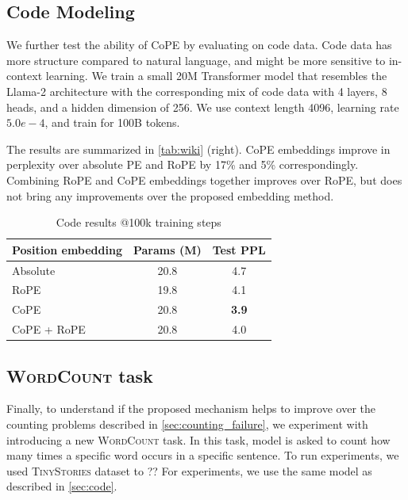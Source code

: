 \documentclass{article}
\newcommand{\ours}{CoPE\xspace}
\begin{document}
\subsection{Code Modeling}

We further test the ability of \ours by evaluating on code data. Code data has more structure compared to natural language, and might be more sensitive to in-context learning. We train a small 20M Transformer model that resembles the Llama-2 architecture with the corresponding mix of code data \citep{Touvron2023Llama2O} with 4 layers, 8 heads, and a hidden dimension of 256. 
We use context length 4096, learning rate  $5.0e-4$, and train for 100B tokens.

The results are summarized in \cref{tab:wiki} (right).  \ours embeddings improve in perplexity over absolute PE and RoPE by 17\% and 5\% correspondingly. Combining RoPE and \ours embeddings together improves over RoPE, but does not bring any improvements over the proposed embedding method. 

\begin{table}
  \caption{Code results @100k training steps}
  \label{tab:code}
  \centering
  \begin{tabular}{lcc}
    \toprule
    Position embedding   &  Params (M) & Test PPL     \\
    \midrule
    Absolute & 20.8 & 4.7 \\
    RoPE & 19.8 & 4.1 \\
    \ours & 20.8 & \bf 3.9 \\
    \ours{} + RoPE & 20.8 & 4.0 \\
    \bottomrule
  \end{tabular}
\end{table}
\fi

\subsection{\textsc{WordCount} task}
Finally, to understand if the proposed mechanism helps to improve over the counting problems described in \cref{sec:counting_failure}, we experiment with introducing a new \textsc{WordCount} task. In this task, model is asked to count how many times a specific word occurs in a specific sentence. To run experiments, we used \textsc{TinyStories} dataset \citep{eldan2023tinystories} to ?? 
For experiments, we use the same model as described in \cref{sec:code}.
\end{document}
